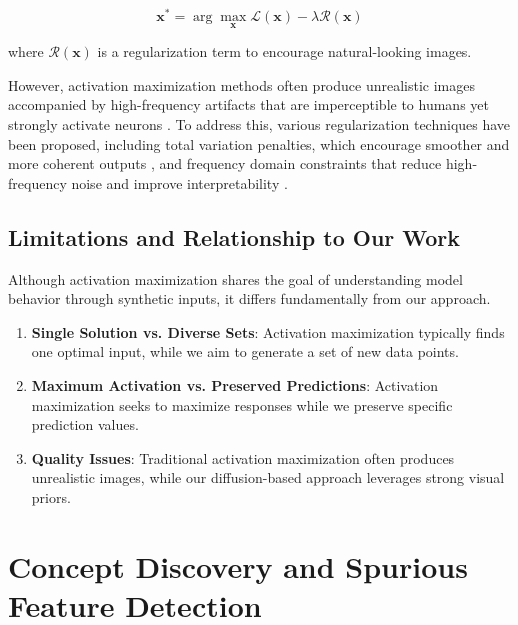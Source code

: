 \documentclass[licencjacka,en]{pracamgr}
\begin{document}
\begin{equation}
\mathbf{x}^* = \arg\max_{\mathbf{x}} \mathcal{L}(\mathbf{x}) - \lambda \mathcal{R}(\mathbf{x})
\label{eq:activation_maximization}
\end{equation}

where $\mathcal{R}(\mathbf{x})$ is a regularization term to encourage natural-looking images.

However, activation maximization methods often produce unrealistic images accompanied by high-frequency artifacts that are imperceptible to humans yet strongly activate neurons \citep{shinkle2025visualizingcontrollingcorticalresponses, nanfack2023adversarialattacksinterpretationneuron, zhu2025representationunderstandingactivationmaximization}. To address this, various regularization techniques have been proposed, including total variation penalties, which encourage smoother and more coherent outputs \citep{mahendran2014understandingdeepimagerepresentations}, and frequency domain constraints that reduce high-frequency noise and improve interpretability \citep{olah2017feature}.

\subsection{Limitations and Relationship to Our Work}

Although activation maximization shares the goal of understanding model behavior through synthetic inputs, it differs fundamentally from our approach.

\begin{enumerate}
\item \textbf{Single Solution vs. Diverse Sets}: Activation maximization typically finds one optimal input, while we aim to generate a set of new data points.

\item \textbf{Maximum Activation vs. Preserved Predictions}: Activation maximization seeks to maximize responses while we preserve specific prediction values.

\item \textbf{Quality Issues}: Traditional activation maximization often produces unrealistic images, while our diffusion-based approach leverages strong visual priors.
\end{enumerate}

\section{Concept Discovery and Spurious Feature Detection}
\end{document}
